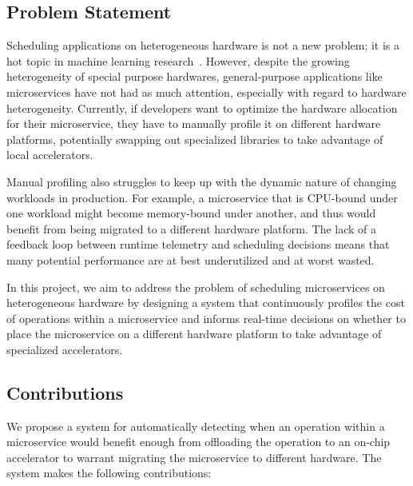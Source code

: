 \subsection{Problem Statement}

Scheduling applications on heterogeneous hardware is not a new problem; it is a hot topic in machine learning research~\cite{narayanan2023hetero,subramanya2023sia}.
However, despite the growing heterogeneity of special purpose hardwares, general-purpose applications like microservices have not had as much attention, especially with regard to hardware heterogeneity.
Currently, if developers want to optimize the hardware allocation for their microservice, they have to manually profile it on different hardware platforms, potentially swapping out specialized libraries to take advantage of local accelerators.

Manual profiling also struggles to keep up with the dynamic nature of changing workloads in production.
For example, a microservice that is CPU-bound under one workload might become memory-bound under another, and thus would benefit from being migrated to a different hardware platform.
The lack of a feedback loop between runtime telemetry and scheduling decisions means that many potential performance are at best underutilized and at worst wasted.

In this project, we aim to address the problem of scheduling microservices on heterogeneous hardware by designing a system that continuously profiles the cost of operations within a microservice and informs real-time decisions on whether to place the microservice on a different hardware platform to take advantage of specialized accelerators.

\subsection{Contributions}

We propose a system for automatically detecting when an operation within a microservice would benefit enough from offloading the operation to an on-chip accelerator to warrant migrating the microservice to different hardware.
The system makes the following contributions:

